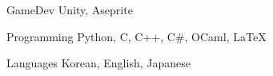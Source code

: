 

\begin{cvskills}

  \cvskill
    {GameDev} %
    {Unity, Aseprite} %

  \cvskill
    {Programming} %
    {Python, C, C++, C\#, OCaml, LaTeX} %

  \cvskill
    {Languages} %
    {Korean, English, Japanese} %

\end{cvskills}
